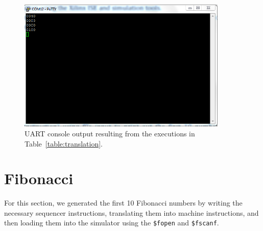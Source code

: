 \documentclass[]{article}
\begin{document}
\begin{figure}[H]
\centering
\includegraphics[width=10cm]{translation.PNG}
\caption{UART console output resulting from the executions in Table~\ref{table:translation}.}
\end{figure}

\section{Fibonacci}

For this section, we generated the first 10 Fibonacci numbers by writing the necessary sequencer instructions, translating them into machine instructions, and then loading them into the simulator using the \texttt{\$fopen} and \texttt{\$fscanf}.

\end{document}
